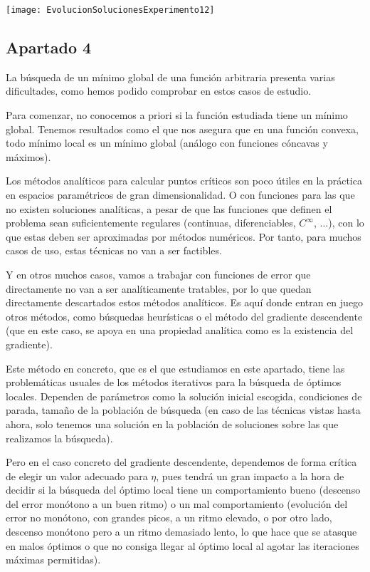\documentclass[11pt]{article}
\begin{document}
\texttt{[image: EvolucionSolucionesExperimento12]}

\subsection{Apartado 4}

La búsqueda de un mínimo global de una función arbitraria presenta varias dificultades, como hemos podido comprobar en estos casos de estudio.

Para comenzar, no conocemos a priori si la función estudiada tiene un mínimo global. Tenemos resultados como el que nos asegura que en una función convexa, todo mínimo local es un mínimo global (análogo con funciones cóncavas y máximos).

Los métodos analíticos para calcular puntos críticos son poco útiles en la práctica en espacios paramétricos de gran dimensionalidad. O con funciones para las que no existen soluciones analíticas, a pesar de que las funciones que definen el problema sean suficientemente regulares (continuas, diferenciables, $C^\infty$, $\ldots$), con lo que estas deben ser aproximadas por métodos numéricos. Por tanto, para muchos casos de uso, estas técnicas no van a ser factibles.

Y en otros muchos casos, vamos a trabajar con funciones de error que directamente no van a ser analíticamente tratables, por lo que quedan directamente descartados estos métodos analíticos. Es aquí donde entran en juego otros métodos, como búsquedas heurísticas o el método del gradiente descendente (que en este caso, se apoya en una propiedad analítica como es la existencia del gradiente).

Este método en concreto, que es el que estudiamos en este apartado, tiene las problemáticas usuales de los métodos iterativos para la búsqueda de óptimos locales. Dependen de parámetros como la solución inicial escogida, condiciones de parada, tamaño de la población de búsqueda (en caso de las técnicas vistas hasta ahora, solo tenemos una solución en la población de soluciones sobre las que realizamos la búsqueda).

Pero en el caso concreto del gradiente descendente, dependemos de forma crítica de elegir un valor adecuado para $\eta$, pues tendrá un gran impacto a la hora de decidir si la búsqueda del óptimo local tiene un comportamiento bueno (descenso del error monótono a un buen ritmo) o un mal comportamiento (evolución del error no monótono, con grandes picos, a un ritmo elevado, o por otro lado, descenso monótono pero a un ritmo demasiado lento, lo que hace que se atasque en malos óptimos o que no consiga llegar al óptimo local al agotar las iteraciones máximas permitidas).
\end{document}
